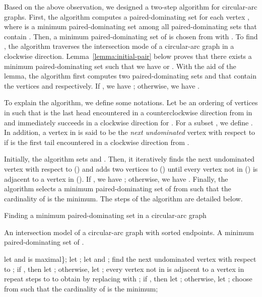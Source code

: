 \documentclass[12pt]{article}
\begin{document}
Based on the above observation, we designed a two-step algorithm
for circular-arc graphs. First, the algorithm computes a paired-dominating set  for each vertex , where  is a minimum paired-dominating set among all paired-dominating sets that contain . Then, a minimum paired-dominating set  of  is chosen from  with . To find , the
algorithm traverses the intersection mode  of a circular-arc
graph  in a clockwise direction. Lemma~\ref{lemma:initial-pair} below proves that there exists a minimum
paired-dominating set  such that we have  or . With the aid of the lemma, the
algorithm first computes two paired-dominating sets  and
 that contain the vertices  and
 respectively. If ,
we have ; otherwise, we have .

To explain the algorithm, we define some notations.
Let  be an ordering of vertices in  such
that  is the last head encountered in a counterclockwise
direction from  in  and 
immediately succeeds  in a clockwise direction for . For a subset , we define . In addition, a
vertex  in  is said to be the {\em next undominated}
vertex with respect to  if  is the first tail encountered
in a clockwise direction from .

Initially, the algorithm sets  and
. Then, it iteratively finds
the next undominated vertex  with respect to
 () and adds two vertices to  () until
every vertex not in  () is adjacent to a vertex in
 (). If , we have
; otherwise, we have . Finally, the algorithm selects a minimum paired-dominating set  of  from
 such that the cardinality of  is the minimum. The steps of the algorithm are detailed below.

\medskip

\begin{algorithm}
\caption{Finding a minimum paired-dominating set in a circular-arc
graph}
\begin{algorithmic} [1]
\REQUIRE An intersection model  of a circular-arc graph
 with sorted endpoints.
\ENSURE A minimum paired-dominating set  of
.

\STATE let  and  is maximal\};
\STATE let ;
\STATE let  and ;
\REPEAT
\STATE find the next undominated vertex  with respect to ;
\STATE if , then let ;
\STATE otherwise, let ;
\UNTIL every vertex not in  is adjacent to a vertex in 
\STATE repeat steps  to  to obtain  by replacing  with ;
\STATE if , then let ; otherwise, let ;
\ENDFOR \STATE choose  from  such that the cardinality of  is the minimum;
\RETURN 
\end{algorithmic}
\end{algorithm}
\end{document}

